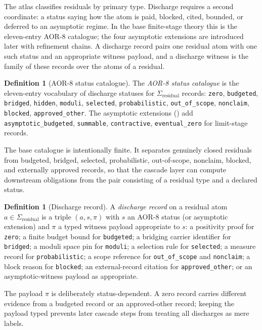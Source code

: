 \documentclass[11pt]{article}
\newcommand{\Sigres}{\Sigma_{\mathrm{residual}}}
\theoremstyle{definition}
\newtheorem{definition}[theorem]{Definition}
\begin{document}
The atlas classifies residuals by primary type.  Discharge requires a second
coordinate: a status saying how the atom is paid, blocked, cited, bounded, or
deferred to an asymptotic regime.  In the base finite-stage theory this is the
eleven-entry AOR-8 catalogue; the four asymptotic extensions are introduced
later with refinement chains.  A discharge record pairs one residual atom with
one such status and an appropriate witness payload, and a discharge witness is
the family of these records over the atoms of a residual.

\begin{definition}[AOR-8 status catalogue]\label{def:aor:aor-8-statuses}
The \emph{AOR-8 status catalogue} is the eleven-entry vocabulary of
discharge statuses for $\Sigres$ records:
\texttt{zero}, \texttt{budgeted}, \texttt{bridged}, \texttt{hidden},
\texttt{moduli}, \texttt{selected}, \texttt{probabilistic},
\texttt{out\_of\_scope}, \texttt{nonclaim}, \texttt{blocked},
\texttt{approved\_other}.
The asymptotic extensions () add
\texttt{asymptotic\_budgeted}, \texttt{summable}, \texttt{contractive},
\texttt{eventual\_zero} for limit-stage records.
\end{definition}

The base catalogue is intentionally finite.  It separates genuinely closed
residuals from budgeted, bridged, selected, probabilistic, out-of-scope,
nonclaim, blocked, and externally approved records, so that the cascade layer
can compute downstream obligations from the pair consisting of a residual type
and a declared status.

\begin{definition}[Discharge record]\label{def:aor:discharge-record}
A \emph{discharge record} on a residual atom $a\in\Sigres$ is a triple
$(a,s,\pi)$ with $s$ an AOR-8 status (or asymptotic extension) and
$\pi$ a typed witness payload appropriate to $s$: a positivity proof
for \texttt{zero}; a finite budget bound for \texttt{budgeted}; a
bridging carrier identifier for \texttt{bridged}; a moduli space pin
for \texttt{moduli}; a selection rule for \texttt{selected}; a measure
record for \texttt{probabilistic}; a scope reference for
\texttt{out\_of\_scope} and \texttt{nonclaim}; a block reason for
\texttt{blocked}; an external-record citation for \texttt{approved\_other};
or an asymptotic-witness payload as appropriate.
\end{definition}

The payload \(\pi\) is deliberately status-dependent.  A zero record carries
different evidence from a budgeted record or an approved-other record; keeping
the payload typed prevents later cascade steps from treating all discharges as
mere labels.
\end{document}
